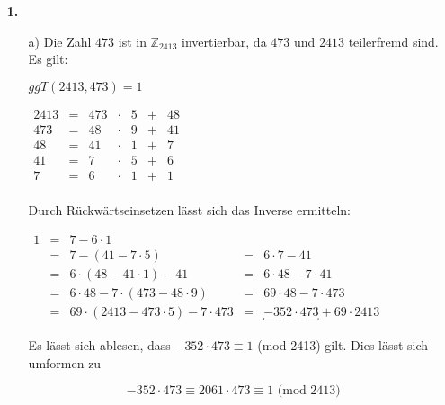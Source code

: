 \documentclass[a4paper,10pt]{scrartcl}
\author{\authorinfo}
\title{\titleinfo}
\date{\today}
\begin{document}
\setcounter{secnumdepth}{0}
\maketitle


\begin{enumerate}
    \item[\textbf{1.}]
        \begin{enumerate}
            \item[a)]
                Die Zahl $473$ ist in $\mathbb{Z}_{2413}$ invertierbar, da $473$ und $2413$ teilerfremd sind. Es gilt:

                $ggT(2413, 473) = 1$

                $\begin{array}{rcrclcl}
                    2413 &=& 473 &\cdot&  5 &+& 48 \\
                    473  &=&  48 &\cdot&  9 &+& 41 \\
                    48   &=&  41 &\cdot&  1 &+&  7 \\
                    41   &=&   7 &\cdot&  5 &+&  6 \\
                    7    &=&   6 &\cdot&  1 &+&  1 \\
                \end{array}$

                Durch Rückwärtseinsetzen lässt sich das Inverse ermitteln:

                $\begin{array}{lclcl}
                    1
                    &=& 7 - 6 \cdot 1\\
                    &=& 7 - (41 - 7 \cdot 5) &=& 6 \cdot 7 - 41 \\
                    &=& 6 \cdot (48 -  41 \cdot 1) - 41 &=& 6 \cdot 48 - 7 \cdot 41\\
                    &=& 6 \cdot 48 - 7 \cdot (473 - 48 \cdot 9) &=& 69 \cdot 48 - 7 \cdot 473\\
                    &=& 69 \cdot (2413 - 473 \cdot 5) - 7 \cdot 473
                        &=& \underbracket{-352 \cdot 473} + 69 \cdot 2413
                \end{array}$

                Es lässt sich ablesen, dass $-352 \cdot 473 \equiv 1$ (mod 2413) gilt. Dies lässt sich umformen zu

                $$-352 \cdot 473 \equiv 2061 \cdot 473 \equiv 1 \text{ (mod 2413)}$$


\end{enumerate}
\end{enumerate}
\end{document}
